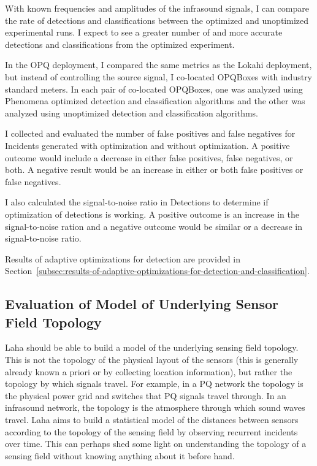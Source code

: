 With known frequencies and amplitudes of the infrasound signals, I can compare the rate of detections and classifications between the optimized and unoptimized experimental runs. I expect to see a greater number of and more accurate detections and classifications from the optimized experiment.

In the OPQ deployment, I compared the same metrics as the Lokahi deployment, but instead of controlling the source signal, I co-located OPQBoxes with industry standard meters. In each pair of co-located OPQBoxes, one was analyzed using Phenomena optimized detection and classification algorithms and the other was analyzed using unoptimized detection and classification algorithms.

I collected and evaluated the number of false positives and false negatives for Incidents generated with optimization and without optimization. A positive outcome would include a decrease in either false positives, false negatives, or both. A negative result would be an increase in either or both false positives or false negatives.

I also calculated the signal-to-noise ratio in Detections to determine if optimization of detections is working. A positive outcome is an increase in the signal-to-noise ration and a negative outcome would be similar or a decrease in signal-to-noise ratio.

Results of adaptive optimizations for detection are provided in Section~\ref{subsec:results-of-adaptive-optimizations-for-detection-and-classification}.

\subsection{Evaluation of Model of Underlying Sensor Field Topology}\label{subsec:evaluation-of-model-of-underlying-sensor-field-topology}
Laha should be able to build a model of the underlying sensing field topology. This is not the topology of the physical layout of the sensors (this is generally already known a priori or by collecting location information), but rather the topology by which signals travel. For example, in a PQ network the topology is the physical power grid and switches that PQ signals travel through. In an infrasound network, the topology is the atmosphere through which sound waves travel. Laha aims to build a statistical model of the distances between sensors according to the topology of the sensing field by observing recurrent incidents over time. This can perhaps shed some light on understanding the topology of a sensing field without knowing anything about it before hand.

